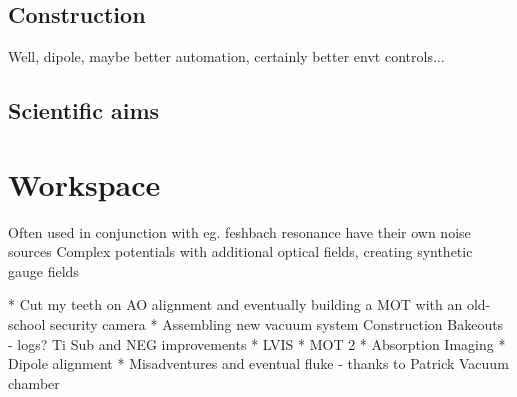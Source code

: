 \subsection*{Construction}

Well, dipole, maybe better automation, certainly better envt controls...
	
\subsection*{Scientific aims}

\section*{Workspace}


		
	Often used in conjunction with eg.
	feshbach resonance 
	have their own noise sources
		\cite{Pichler10}%
	Complex potentials with additional optical fields, creating synthetic gauge fields
		\cite{Aidelsburger11,Aidelsburger13,Miyake13}


* Cut my teeth on AO alignment and eventually building
a MOT with an old-school security camera * Assembling new vacuum system
Construction Bakeouts - logs? Ti Sub and NEG improvements * LVIS * MOT 2
* Absorption Imaging * Dipole alignment * Misadventures and eventual
fluke - thanks to Patrick
Vacuum chamber

